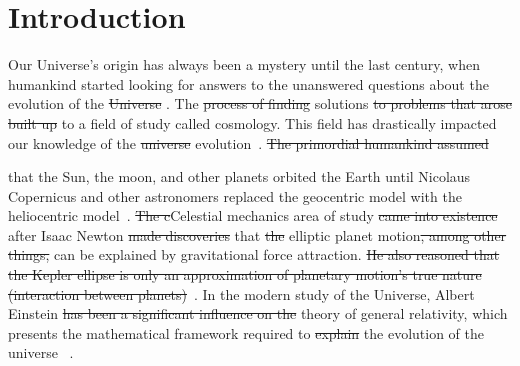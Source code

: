 \chapter{Introduction}

Our Universe's origin has always been a mystery until the last century, when humankind started looking for  answers to the unanswered questions about the evolution of the \st{Universe} . The \st{process of finding}  solutions \st{to problems that arose built up}  to a field of study called cosmology. This field has drastically impacted our knowledge of the \st{universe}  evolution~\citep{book:909085}. \st{The primordial humankind assumed}

  that the Sun, the moon, and other planets orbited the Earth until Nicolaus Copernicus and other astronomers replaced the geocentric model with the heliocentric model~\citep{sep-copernicus, kanas}. \st{The c}{\attention C}elestial mechanics  area of study \st{came into existence} after Isaac Newton \st{made discoveries}  that \st{the} elliptic planet motion\st{, among other things,} can be explained by gravitational force attraction. \st{He also reasoned that the Kepler ellipse is only an approximation of planetary motion's true nature (interaction between planets)}~\citep{crowe2013theories,sep-copernicus}.  In the modern study of the Universe,  Albert Einstein \st{has been a significant influence on the} theory of general relativity, which presents the mathematical framework required to \st{explain}  the evolution of the universe ~\citep{1965ApJ...142..419P}.  
	
